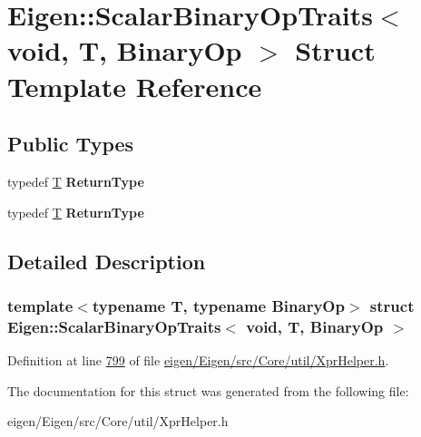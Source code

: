 \hypertarget{struct_eigen_1_1_scalar_binary_op_traits_3_01void_00_01_t_00_01_binary_op_01_4}{}\section{Eigen\+:\+:Scalar\+Binary\+Op\+Traits$<$ void, T, Binary\+Op $>$ Struct Template Reference}
\label{struct_eigen_1_1_scalar_binary_op_traits_3_01void_00_01_t_00_01_binary_op_01_4}
\subsection*{Public Types}
\begin{DoxyCompactItemize}
\item 
\mbox{\label{struct_eigen_1_1_scalar_binary_op_traits_3_01void_00_01_t_00_01_binary_op_01_4_a74cfc68c9c5a4440874c383b773be35d}} 
typedef \hyperlink{group___sparse_core___module}{T} {\bfseries Return\+Type}
\item 
\mbox{\label{struct_eigen_1_1_scalar_binary_op_traits_3_01void_00_01_t_00_01_binary_op_01_4_a74cfc68c9c5a4440874c383b773be35d}} 
typedef \hyperlink{group___sparse_core___module}{T} {\bfseries Return\+Type}
\end{DoxyCompactItemize}


\subsection{Detailed Description}
\subsubsection*{template$<$typename T, typename Binary\+Op$>$\newline
struct Eigen\+::\+Scalar\+Binary\+Op\+Traits$<$ void, T, Binary\+Op $>$}



Definition at line \hyperlink{eigen_2_eigen_2src_2_core_2util_2_xpr_helper_8h_source_l00799}{799} of file \hyperlink{eigen_2_eigen_2src_2_core_2util_2_xpr_helper_8h_source}{eigen/\+Eigen/src/\+Core/util/\+Xpr\+Helper.\+h}.



The documentation for this struct was generated from the following file\+:\begin{DoxyCompactItemize}
\item 
eigen/\+Eigen/src/\+Core/util/\+Xpr\+Helper.\+h\end{DoxyCompactItemize}
